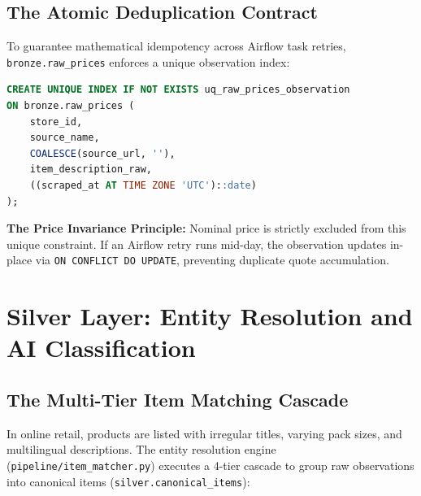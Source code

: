 \documentclass[11pt,a4paper,oneside]{article}
\begin{document}
\subsection{The Atomic Deduplication Contract}
To guarantee mathematical idempotency across Airflow task retries, \texttt{bronze.raw\_prices} enforces a unique observation index:
\begin{lstlisting}[language=SQL]
CREATE UNIQUE INDEX IF NOT EXISTS uq_raw_prices_observation 
ON bronze.raw_prices (
    store_id, 
    source_name, 
    COALESCE(source_url, ''), 
    item_description_raw, 
    ((scraped_at AT TIME ZONE 'UTC')::date)
);
\end{lstlisting}
\textbf{The Price Invariance Principle:} Nominal price is strictly excluded from this unique constraint. If an Airflow retry runs mid-day, the observation updates in-place via \texttt{ON CONFLICT DO UPDATE}, preventing duplicate quote accumulation.

\newpage

\section{Silver Layer: Entity Resolution and AI Classification}

\subsection{The Multi-Tier Item Matching Cascade}
In online retail, products are listed with irregular titles, varying pack sizes, and multilingual descriptions. The entity resolution engine (\texttt{pipeline/item\_matcher.py}) executes a 4-tier cascade to group raw observations into canonical items (\texttt{silver.canonical\_items}):
\end{document}
